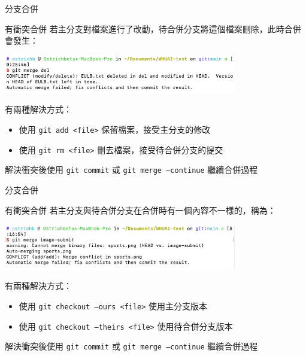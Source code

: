 \documentclass[xetex, unicode, 10pt, aspectratio=169]{beamer}
\begin{document}
\begin{frame}{分支合併}
    \begin{block}{有衝突合併}
        若主分支對檔案進行了改動，待合併分支將這個檔案刪除，此時合併會發生：
        \begin{center}
            \includegraphics[width=4in]{./img/git-merge-modify-delete-conflict.png}
        \end{center}
        \pause

        有兩種解決方式：
        \begin{itemize}
            \item 使用 \texttt{git add <file>} 保留檔案，接受主分支的修改
            \item 使用 \texttt{git rm <file>} 刪去檔案，接受待合併分支的提交
        \end{itemize}

        解決衝突後使用 \texttt{git commit} 或 \texttt{git merge --continue} 繼續合併過程
    \end{block}
\end{frame}

\begin{frame}{分支合併}
    \begin{block}{有衝突合併}
        若主分支與待合併分支在合併時有一個內容不一樣的，稱為：

        \begin{center}
            \includegraphics[width=4in]{./img/git-merge-add-add-conflict.png}
        \end{center}
        \pause

        有兩種解決方式：
        \begin{itemize}
            \item 使用 \texttt{git checkout --ours <file>} 使用主分支版本
            \item 使用 \texttt{git checkout --theirs <file>} 使用待合併分支版本
        \end{itemize}

        解決衝突後使用 \texttt{git commit} 或 \texttt{git merge --continue} 繼續合併過程

    \end{block}
\end{frame}
\end{document}
